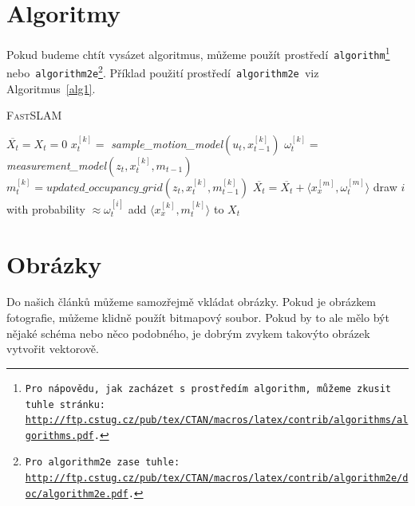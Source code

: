 \documentclass[11pt, a4paper]{article}
\begin{document}
\section{Algoritmy}\label{sek3}
Pokud budeme chtít vysázet algoritmus, můžeme použít prostředí\texttt{ algorithm\footnote{Pro nápovědu, jak zacházet s~prostředím\texttt{ algorithm}, můžeme zkusit tuhle stránku:\\\href{http://ftp.cstug.cz/pub/tex/CTAN/macros/latex/contrib/algorithms/algorithms.pdf}{http://ftp.cstug.cz/pub/tex/CTAN/macros/latex/contrib/algorithms/algorithms.pdf}.} }nebo\texttt{ algorithm2e\footnote{Pro\texttt{ algorithm2e }zase tuhle: \href{http://ftp.cstug.cz/pub/tex/CTAN/macros/latex/contrib/algorithm2e/doc/algorithm2e.pdf}{http://ftp.cstug.cz/pub/tex/CTAN/macros/latex/contrib/algorithm2e/doc/algorithm2e.pdf}.}}. Příklad použití prostředí\texttt{ algorithm2e }viz Algoritmus~\ref{alg1}.
\bigskip
\begin{algorithm}[h]\label{alg1}
    \caption{\textsc{FastSLAM}}
    \begin{algorithmic}[1]
    \STATE $\overline{X_{t}}=X_{t}=0$
        \STATE \quad $x_{t}^{[k]}=$ \emph{sample\_motion\_model}$(u_{t},x_{t-1}^{[k]})$
        \STATE \quad $\omega_{t}^{[k]}=$ \emph{measurement\_model}$(z_{t},x_{t}^{[k]},m_{t-1})$
        \STATE \quad $m_{t}^{[k]}=updated\_occupancy\_grid(z_{t},x_{t}^{[k]},m_{t-1}^{[k]})$
        \STATE \quad $\overline{X_{t}}=\overline{X_{t}}+\langle x_{x}^{[m]},\omega_{t}^{[m]}\rangle$
    \ENDFOR
        \STATE \quad draw $i$ with probability $\approx \omega_{t}^{[i]}$
        \STATE \quad add $\langle x_{x}^{[k]},m_{t}^{[k]}\rangle$ to $X_{t}$
    \ENDFOR
    \end{algorithmic}
\end{algorithm}

\section{Obrázky}
Do našich článků můžeme samozřejmě vkládat obrázky. Pokud je obrázkem fotografie, můžeme klidně použít bitmapový soubor. Pokud by to ale mělo být nějaké schéma nebo něco podobného, je dobrým zvykem takovýto obrázek vytvořit vektorově.
\end{document}
